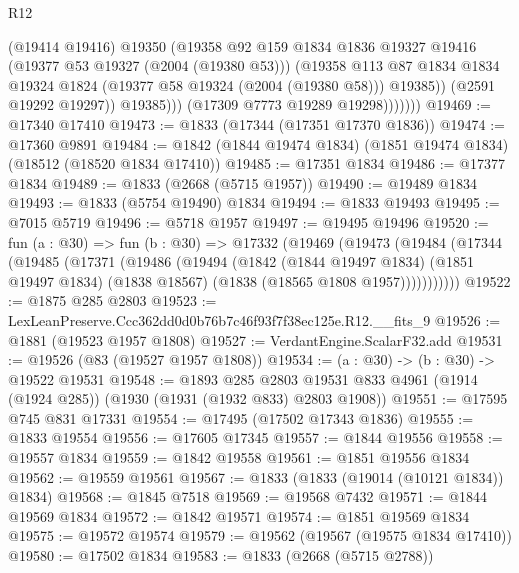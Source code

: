 \begin{lexlean}{R12}
\begin{coremodule}
                        (@19414 @19416)
                        @19350
                        (@19358
                          @92
                          @159
                          @1834
                          @1836
                          @19327
                          @19416
                          (@19377 @53 @19327 (@2004 (@19380 @53)))
                          (@19358
                            @113
                            @87
                            @1834
                            @1834
                            @19324
                            @1824
                            (@19377 @58 @19324 (@2004 (@19380 @58)))
                            @19385))
                        (@2591 @19292 @19297))
                      @19385)))
                (@17309 @7773 @19289 @19298)))))))
@19469 := @17340 @17410
@19473 := @1833 (@17344 (@17351 @17370 @1836))
@19474 := @17360 @9891
@19484 := @1842 (@1844 @19474 @1834) (@1851 @19474 @1834) (@18512 (@18520 @1834 @17410))
@19485 := @17351 @1834
@19486 := @17377 @1834
@19489 := @1833 (@2668 (@5715 @1957))
@19490 := @19489 @1834
@19493 := @1833 (@5754 @19490) @1834
@19494 := @1833 @19493
@19495 := @7015 @5719
@19496 := @5718 @1957
@19497 := @19495 @19496
@19520 := fun (a : @30) =>
  fun (b : @30) =>
  @17332
    (@19469
      (@19473
        (@19484
          (@17344
            (@19485
              (@17371
                (@19486
                  (@19494
                    (@1842
                      (@1844 @19497 @1834)
                      (@1851 @19497 @1834)
                      (@1838 @18567)
                      (@1838 (@18565 @1808 @1957)))))))))))
@19522 := @1875 @285 @2803
@19523 := LexLeanPreserve.Ccc362dd0d0b76b7c46f93f7f38ec125e.R12.__fits_9
@19526 := @1881 (@19523 @1957 @1808)
@19527 := VerdantEngine.ScalarF32.add
@19531 := @19526 (@83 (@19527 @1957 @1808))
@19534 := (a : @30) -> (b : @30) -> @19522 @19531
@19548 := @1893
    @285
    @2803
    @19531
    @833
    @4961
    (@1914 (@1924 @285))
    (@1930 (@1931 (@1932 @833) @2803 @1908))
@19551 := @17595 @745 @831 @17331
@19554 := @17495 (@17502 @17343 @1836)
@19555 := @1833 @19554
@19556 := @17605 @17345
@19557 := @1844 @19556
@19558 := @19557 @1834
@19559 := @1842 @19558
@19561 := @1851 @19556 @1834
@19562 := @19559 @19561
@19567 := @1833 (@1833 (@19014 (@10121 @1834)) @1834)
@19568 := @1845 @7518
@19569 := @19568 @7432
@19571 := @1844 @19569 @1834
@19572 := @1842 @19571
@19574 := @1851 @19569 @1834
@19575 := @19572 @19574
@19579 := @19562 (@19567 (@19575 @1834 @17410))
@19580 := @17502 @1834
@19583 := @1833 (@2668 (@5715 @2788))

\end{coremodule}
\end{lexlean}
